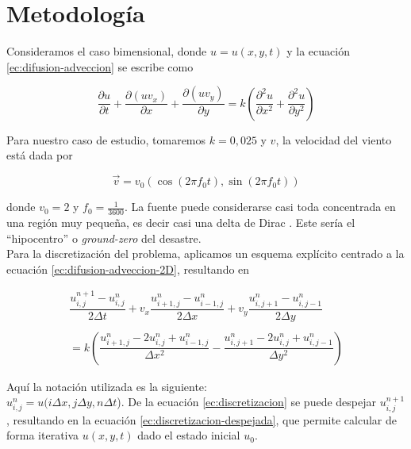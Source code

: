 \documentclass[twocolumn,a4paper,10pt]{article}
\begin{document}
\section{Metodolog\'ia}
\label{sec:metodologia}
Consideramos el caso bimensional, donde $u = u(x,y,t)$ y la ecuaci\'on \ref{ec:difusion-adveccion} se escribe como \cite{Guia2-MNA}

\begin{equation}
\label{ec:difusion-adveccion-2D}
\frac{\partial u}{\partial t} + \frac{\partial (uv_{x})}{\partial x} + \frac{\partial (uv_{y})}{\partial y}  = k \left(\frac{\partial^2 u}{\partial x^2} + \frac{\partial^2 u}{\partial y^2}\right)
\end{equation}

Para nuestro caso de estudio, tomaremos $k = 0,025$ y $v$, la velocidad del viento est\'a dada por 

\begin{equation}
    \vec{v} = v_{0}(\cos (2\pi f_{0}t), \sin (2\pi f_{0}t))
\end{equation}

donde $v_{0} = 2$ y $f_{0} = \frac{1}{3600}$. La fuente puede considerarse casi toda concentrada en una regi\'on muy pequeña, es decir casi una 
delta de Dirac \cite{Guia2-MNA}. Este sería el ``hipocentro'' o \textit{ground-zero} \cite{groun-zero} del desastre. \\

Para la discretizaci\'on del problema, aplicamos un esquema expl\'icito centrado a la ecuaci\'on \ref{ec:difusion-adveccion-2D}, resultando en 

\begin{equation}
\label{ec:discretizacion}
\begin{array}{c}
\dfrac{u_{i,j}^{n+1} - u_{i,j}^{n}}{2\Delta t} + v_{x}\dfrac{u_{i+1,j}^{n} - u_{i-1,j}^{n}}{2\Delta x} +  v_{y}\dfrac{u_{i,j+1}^{n} - u_{i,j-1}^{n}}{2\Delta y} \\
    \\
    = k \left( \dfrac{u_{i+1,j}^{n} - 2u_{i,j}^{n} + u_{i-1,j}^{n}}{\Delta x^2} - \dfrac{u_{i,j+1}^{n} - 2u_{i,j}^{n} + u_{i,j-1}^{n}}{\Delta y^2}  \right)
\end{array}       
\end{equation}

Aqu\'i la notaci\'on utilizada es la siguiente: \\
$u_{i, j}^{n} = u(i\Delta x, j\Delta y, n\Delta t$).
De la ecuaci\'on \ref{ec:discretizacion} se puede despejar $u_{i,j}^{n+1}$, resultando en la ecuaci\'on \ref{ec:discretizacion-despejada}, que permite calcular 
de forma iterativa $u(x,y,t)$ dado el estado inicial $u_{0}$.
\end{document}
